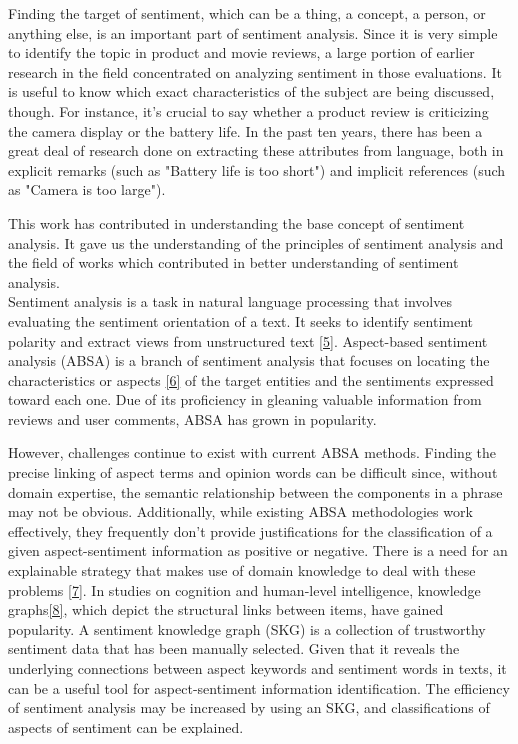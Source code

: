 \documentclass[conference]{IEEEtran}
\begin{document}
	Finding the target of sentiment, which can be a thing, a concept, a person, or anything else, is an important part of sentiment analysis. Since it is very simple to identify the topic in product and movie reviews, a large portion of earlier research in the field concentrated on analyzing sentiment in those evaluations. It is useful to know which exact characteristics of the subject are being discussed, though. For instance, it's crucial to say whether a product review is criticizing the camera display or the battery life. In the past ten years, there has been a great deal of research done on extracting these attributes from language, both in explicit remarks (such as "Battery life is too short") and implicit references (such as "Camera is too large").

	This work has contributed in understanding the base concept of sentiment analysis. It gave us the understanding of the principles of sentiment analysis and the field of works which contributed in better understanding of sentiment analysis.\\
	
	Sentiment analysis is a task in natural language processing that involves evaluating the sentiment orientation of a text. It seeks to identify sentiment polarity and extract views from unstructured text \href{https://www.sciencedirect.com/science/article/abs/pii/S0950705118306105}{[5]}. Aspect-based sentiment analysis (ABSA) is a branch of sentiment analysis that focuses on locating the characteristics or aspects \href{https://www.sciencedirect.com/science/article/abs/pii/S0925231219311920}{[6]} of the target entities and the sentiments expressed toward each one. Due of its proficiency in gleaning valuable information from reviews and user comments, ABSA has grown in popularity. 
	
	However, challenges continue to exist with current ABSA methods. Finding the precise linking of aspect terms and opinion words can be difficult since, without domain expertise, the semantic relationship between the components in a phrase may not be obvious. Additionally, while existing ABSA methodologies work effectively, they frequently don't provide justifications for the classification of a given aspect-sentiment information as positive or negative. There is a need for an explainable strategy that makes use of domain knowledge to deal with these problems \href{https://www.sciencedirect.com/science/article/abs/pii/S0925231219311920}{[7]}. In studies on cognition and human-level intelligence, knowledge graphs\href{https://www.sciencedirect.com/science/article/abs/pii/S0893608019301613}{[8]}, which depict the structural links between items, have gained popularity. A sentiment knowledge graph (SKG) is a collection of trustworthy sentiment data that has been manually selected. Given that it reveals the underlying connections between aspect keywords and sentiment words in texts, it can be a useful tool for aspect-sentiment information identification. The efficiency of sentiment analysis may be increased by using an SKG, and classifications of aspects of sentiment can be explained.\\
	
\end{document}

